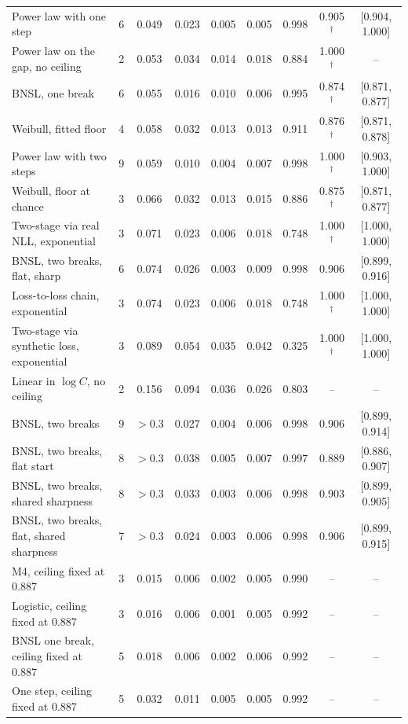 \begin{table}[h]
\begin{tabular}{lcccccccc}
    Power law with one step                          & 6 & 0.049 & 0.023 & 0.005 & 0.005 & 0.998 & 0.905$^{\dagger}$ & [0.904, 1.000] \\
    Power law on the gap, no ceiling                 & 2 & 0.053 & 0.034 & 0.014 & 0.018 & 0.884 & 1.000$^{\dagger}$ & -- \\
    BNSL, one break                                  & 6 & 0.055 & 0.016 & 0.010 & 0.006 & 0.995 & 0.874$^{\dagger}$ & [0.871, 0.877] \\
    Weibull, fitted floor                            & 4 & 0.058 & 0.032 & 0.013 & 0.013 & 0.911 & 0.876$^{\dagger}$ & [0.871, 0.878] \\
    Power law with two steps                         & 9 & 0.059 & 0.010 & 0.004 & 0.007 & 0.998 & 1.000$^{\dagger}$ & [0.903, 1.000] \\
    Weibull, floor at chance                         & 3 & 0.066 & 0.032 & 0.013 & 0.015 & 0.886 & 0.875$^{\dagger}$ & [0.871, 0.877] \\
    Two-stage via real NLL, exponential              & 3 & 0.071 & 0.023 & 0.006 & 0.018 & 0.748 & 1.000$^{\dagger}$ & [1.000, 1.000] \\
    BNSL, two breaks, flat, sharp                    & 6 & 0.074 & 0.026 & 0.003 & 0.009 & 0.998 & 0.906 & [0.899, 0.916] \\
    Loss-to-loss chain, exponential                  & 3 & 0.074 & 0.023 & 0.006 & 0.018 & 0.748 & 1.000$^{\dagger}$ & [1.000, 1.000] \\
    Two-stage via synthetic loss, exponential        & 3 & 0.089 & 0.054 & 0.035 & 0.042 & 0.325 & 1.000$^{\dagger}$ & [1.000, 1.000] \\
    Linear in $\log C$, no ceiling                   & 2 & 0.156 & 0.094 & 0.036 & 0.026 & 0.803 & -- & -- \\
    BNSL, two breaks                                 & 9 & ${>}0.3$ & 0.027 & 0.004 & 0.006 & 0.998 & 0.906 & [0.899, 0.914] \\
    BNSL, two breaks, flat start                     & 8 & ${>}0.3$ & 0.038 & 0.005 & 0.007 & 0.997 & 0.889 & [0.886, 0.907] \\
    BNSL, two breaks, shared sharpness               & 8 & ${>}0.3$ & 0.033 & 0.003 & 0.006 & 0.998 & 0.903 & [0.899, 0.905] \\
    BNSL, two breaks, flat, shared sharpness         & 7 & ${>}0.3$ & 0.024 & 0.003 & 0.006 & 0.998 & 0.906 & [0.899, 0.915] \\
    \midrule
    M4, ceiling fixed at 0.887                       & 3 & 0.015 & 0.006 & 0.002 & 0.005 & 0.990 & -- & -- \\
    Logistic, ceiling fixed at 0.887                 & 3 & 0.016 & 0.006 & 0.001 & 0.005 & 0.992 & -- & -- \\
    BNSL one break, ceiling fixed at 0.887           & 5 & 0.018 & 0.006 & 0.002 & 0.006 & 0.992 & -- & -- \\
    One step, ceiling fixed at 0.887                 & 5 & 0.032 & 0.011 & 0.005 & 0.005 & 0.992 & -- & -- \\
    \bottomrule
  \end{tabular}
\end{table}

